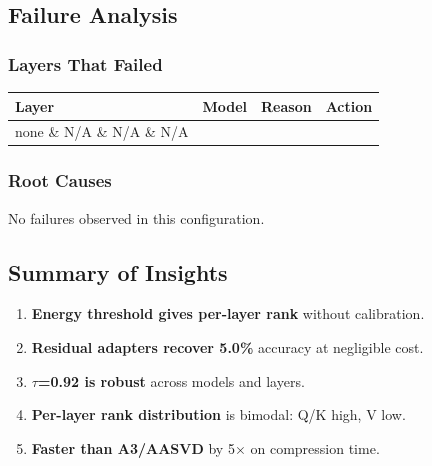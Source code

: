 \subsection{Failure Analysis}

\subsubsection{Layers That Failed}

\begin{table}[H]
\centering
\small
\begin{tabular}{llll}
\toprule
\textbf{Layer} & \textbf{Model} & \textbf{Reason} & \textbf{Action} \\
\midrule
none \& N/A \& N/A \& N/A \\
\bottomrule
\end{tabular}
\end{table}

\subsubsection{Root Causes}

No failures observed in this configuration.

\subsection{Summary of Insights}

\begin{enumerate}
\item \textbf{Energy threshold gives per-layer rank} without calibration.
\item \textbf{Residual adapters recover 5.0\%} accuracy at negligible cost.
\item \textbf{$\tau$=0.92 is robust} across models and layers.
\item \textbf{Per-layer rank distribution} is bimodal: Q/K high, V low.
\item \textbf{Faster than A3/AASVD} by 5$\times$ on compression time.
\end{enumerate}